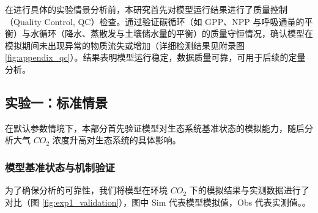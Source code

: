 \documentclass[10pt]{config}
\begin{document}
在进行具体的实验情景分析前，本研究首先对模型运行结果进行了质量控制（Quality Control, QC）检查。通过验证碳循环（如 GPP、NPP 与呼吸通量的平衡）与水循环（降水、蒸散发与土壤储水量的平衡）的质量守恒情况，确认模型在模拟期间未出现异常的物质流失或增加（详细检测结果见附录图 \ref{fig:appendix_qc}）。结果表明模型运行稳定，数据质量可靠，可用于后续的定量分析。

\newpage

\subsection{实验一：标准情景}

在默认参数情境下，本部分首先验证模型对生态系统基准状态的模拟能力，随后分析大气 $CO_2$ 浓度升高对生态系统的具体影响。


\subsubsection{模型基准状态与机制验证}

为了确保分析的可靠性，我们将模型在环境 $CO_2$ 下的模拟结果与实测数据进行了对比（图 \ref{fig:exp1_validation}），图中 Sim 代表模型模拟值，Obs 代表实测值。。
\end{document}

